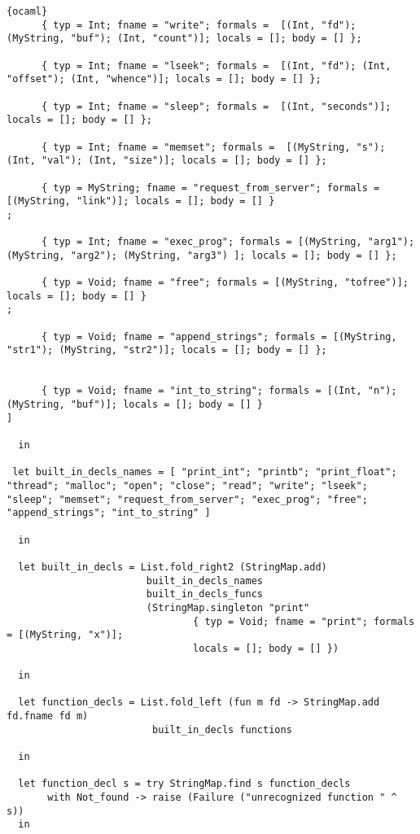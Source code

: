 \begin{lstlisting}{ocaml}
      { typ = Int; fname = "write"; formals =  [(Int, "fd"); (MyString, "buf"); (Int, "count")]; locals = []; body = [] };

      { typ = Int; fname = "lseek"; formals =  [(Int, "fd"); (Int, "offset"); (Int, "whence")]; locals = []; body = [] };

      { typ = Int; fname = "sleep"; formals =  [(Int, "seconds")]; locals = []; body = [] };
      
      { typ = Int; fname = "memset"; formals =  [(MyString, "s"); (Int, "val"); (Int, "size")]; locals = []; body = [] };

      { typ = MyString; fname = "request_from_server"; formals = [(MyString, "link")]; locals = []; body = [] } 
;

      { typ = Int; fname = "exec_prog"; formals = [(MyString, "arg1"); (MyString, "arg2"); (MyString, "arg3") ]; locals = []; body = [] };

      { typ = Void; fname = "free"; formals = [(MyString, "tofree")]; locals = []; body = [] }
;

      { typ = Void; fname = "append_strings"; formals = [(MyString, "str1"); (MyString, "str2")]; locals = []; body = [] };
 
     
      { typ = Void; fname = "int_to_string"; formals = [(Int, "n"); (MyString, "buf")]; locals = []; body = [] }
]

  in

 let built_in_decls_names = [ "print_int"; "printb"; "print_float"; "thread"; "malloc"; "open"; "close"; "read"; "write"; "lseek"; "sleep"; "memset"; "request_from_server"; "exec_prog"; "free"; "append_strings"; "int_to_string" ]

  in

  let built_in_decls = List.fold_right2 (StringMap.add)
                        built_in_decls_names
                        built_in_decls_funcs
                        (StringMap.singleton "print"
                                { typ = Void; fname = "print"; formals = [(MyString, "x")];
                                locals = []; body = [] })

  in

  let function_decls = List.fold_left (fun m fd -> StringMap.add fd.fname fd m)
                         built_in_decls functions

  in

  let function_decl s = try StringMap.find s function_decls
       with Not_found -> raise (Failure ("unrecognized function " ^ s))
  in


\end{lstlisting}
